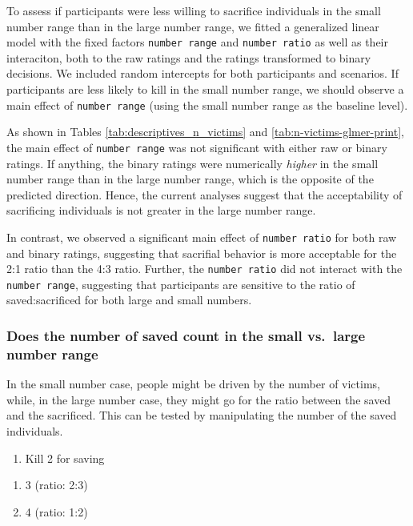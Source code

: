 \documentclass[
]{article}
\providecommand{\tightlist}{%
  \setlength{\itemsep}{0pt}\setlength{\parskip}{0pt}}
\begin{document}
To assess if participants were less willing to sacrifice individuals in the small number range than in the large number range, we fitted a generalized linear model with the fixed factors \texttt{number\ range} and \texttt{number\ ratio} as well as their interaciton, both to the raw ratings and the ratings transformed to binary decisions. We included random intercepts for both participants and scenarios. If participants are less likely to kill in the small number range, we should observe a main effect of \texttt{number\ range} (using the small number range as the baseline level).

As shown in Tables \ref{tab:descriptives_n_victims} and \ref{tab:n-victims-glmer-print}, the main effect of \texttt{number\ range} was not significant with either raw or binary ratings. If anything, the binary ratings were numerically \emph{higher} in the small number range than in the large number range, which is the opposite of the predicted direction. Hence, the current analyses suggest that the acceptability of sacrificing individuals is not greater in the large number range.

In contrast, we observed a significant main effect of \texttt{number\ ratio} for both raw and binary ratings, suggesting that sacrifial behavior is more acceptable for the 2:1 ratio than the 4:3 ratio. Further, the \texttt{number\ ratio} did not interact with the \texttt{number\ range}, suggesting that participants are sensitive to the ratio of saved:sacrificed for both large and small numbers.

\subsubsection{Does the number of saved count in the small vs.~large number range}\label{does-the-number-of-saved-count-in-the-small-vs.-large-number-range}

In the small number case, people might be driven by the number of victims, while, in the large number case, they might go for the ratio between the saved and the sacrificed. This can be tested by manipulating the number of the saved individuals.

\begin{enumerate}
\def\labelenumi{\arabic{enumi}.}
\setcounter{enumi}{3}
\tightlist
\item
  Kill 2 for saving
\end{enumerate}

\begin{enumerate}
\def\labelenumi{\alph{enumi}.}
\tightlist
\item
  3 (ratio: 2:3)
\item
  4 (ratio: 1:2)
\end{enumerate}
\end{document}
